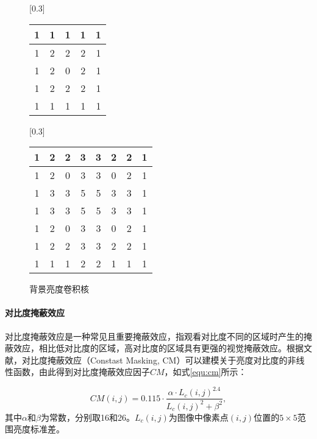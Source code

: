   \begin{figure}
    \hspace{1cm}
		[0.3\textwidth]{
			\begin{tabular}{|c|c|c|c|c|}	\hline
				1 & 1 & 1 & 1 & 1 \\ \hline
				1 & 2 & 2 & 2 & 1 \\ \hline
				1 & 2 & 0 & 2 & 1 \\ \hline
				1 & 2 & 2 & 2 & 1 \\ \hline
				1 & 1 & 1 & 1 & 1 \\ \hline
			\end{tabular}
    }
    \hspace{2cm}
    [0.3\textwidth]{
			\begin{tabular}{|c|c|c|c|c|c|c|c|}	\hline
				1& 2& 2& 3& 3& 2& 2& 1 \\ \hline
				1& 2& 0& 3& 3& 0& 2& 1 \\ \hline
				1& 3& 3& 5& 5& 3& 3& 1 \\ \hline
				1& 3& 3& 5& 5& 3& 3& 1 \\ \hline
				1& 2& 0& 3& 3& 0& 2& 1 \\ \hline
				1& 2& 2& 3& 3& 2& 2& 1 \\ \hline
				1& 1& 1& 2& 2& 1& 1& 1 \\ \hline
			\end{tabular}
		}
    \caption{背景亮度卷积核}
	\end{figure}

  \paragraph{对比度掩蔽效应} 对比度掩蔽效应是一种常见且重要掩蔽效应，指观看对比度不同的区域时产生的掩蔽效应，相比低对比度的区域，高对比度的区域具有更强的视觉掩蔽效应。根据文献\cite{wuPatternMaskingEstimation2013}，对比度掩蔽效应（Constast Masking, CM）可以建模关于亮度对比度的非线性函数，由此得到对比度掩蔽效应因子$CM$，如式\ref{equ:cm}所示：

  \begin{equation} \label{equ:cm}
    CM(i, j) = 0.115 \cdot \frac{\alpha \cdot L_c(i, j)^{2.4}}{L_c(i, j)^2 + \beta^2},
  \end{equation}
  其中$\alpha$和$\beta$为常数，分别取16和26。$L_c(i, j)$为图像中像素点$(i, j)$位置的$5\times 5$范围亮度标准差。

